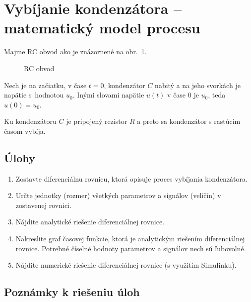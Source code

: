 \documentclass[a4paper, 10pt, ]{article}
\begin{document}
\section{Vybíjanie kondenzátora -- matematický model procesu}
\label{castVybij}

Majme RC obvod ako je znázornené na obr.~\ref{RCobvod}.

\begin{figure}[!ht]
	\centering

	\makebox[\textwidth][c]{%
	
	}

	\caption{RC obvod}
	\label{RCobvod}
\end{figure}

Nech je na začiatku, v čase $t=0$, kondenzátor $C$ nabitý a na jeho svorkách je napätie s~hodnotou $u_0$. Inými slovami napätie $u(t)$ v čase $0$ je $u_0$, teda $u(0) = u_0$.

Ku kondenzátoru $C$ je pripojený rezistor $R$ a preto sa kondenzátor s rastúcim časom vybíja.

\subsection{Úlohy}

\begin{enumerate}

	\item Zostavte diferenciálnu rovnicu, ktorá opisuje proces vybíjania kondenzátora.

    \item Určte jednotky (rozmer) všetkých parametrov a signálov (veličín) v zostavenej rovnici.

    \item Nájdite analytické riešenie diferenciálnej rovnice.

    \item Nakreslite graf časovej funkcie, ktorá je analytickým riešením diferenciálnej rovnice. Potrebné číselné hodnoty parametrov a signálov nech sú ľubovolné.

    \item Nájdite numerické riešenie diferenciálnej rovnice (s využitím Simulinku).

\end{enumerate}




\subsection{Poznámky k riešeniu úloh}
\end{document}
